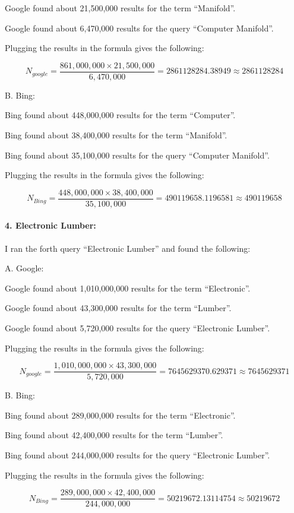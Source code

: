 \documentclass[a4paper, 11pt]{article}
\begin{document}
Google found about 21,500,000 results for the term ``Manifold''.

Google found about 6,470,000 results for the query ``Computer Manifold''.

Plugging the results in the formula gives the following:

$$N_{google} = \frac{861,000,000 \times 21,500,000}{6,470,000} = 2861128284.38949 \approx 2861128284
$$

B. Bing:

Bing found about 448,000,000 results for the term ``Computer''.

Bing found about 38,400,000 results for the term ``Manifold''.

Bing found about 35,100,000 results for the query ``Computer Manifold''.

Plugging the results in the formula gives the following:

$$N_{Bing} = \frac{448,000,000 \times 38,400,000}{35,100,000} = 490119658.1196581 \approx 490119658
$$

\paragraph{4. Electronic Lumber:}
I ran the forth query ``Electronic Lumber'' and found the following:

A. Google:

Google found about 1,010,000,000 results for the term ``Electronic''.

Google found about 43,300,000 results for the term ``Lumber''.

Google found about 5,720,000 results for the query ``Electronic Lumber''.

Plugging the results in the formula gives the following:

$$N_{google} = \frac{1,010,000,000 \times 43,300,000}{5,720,000} = 7645629370.629371 \approx 7645629371
$$

B. Bing:

Bing found about 289,000,000 results for the term ``Electronic''.

Bing found about 42,400,000 results for the term ``Lumber''.

Bing found about 244,000,000 results for the query ``Electronic Lumber''.

Plugging the results in the formula gives the following:

$$N_{Bing} = \frac{289,000,000 \times 42,400,000}{244,000,000} = 50219672.13114754 \approx 50219672
$$
\end{document}
